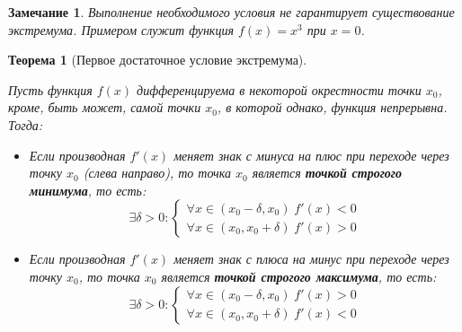 \documentclass[a4paper,12pt,oneside]{extbook}
\newcommand{\newpar}{$ $\par\nobreak\ignorespaces}
\theoremstyle{numbered}
\theoremstyle{unnumbered}
\theoremstyle{named}
\newtheorem{theorem}{Теорема}[section]
\theoremstyle{unnumbered}
\theoremstyle{named}
\theoremstyle{named}
\theoremstyle{named}
\newtheorem*{note}{Замечание}
\begin{document}
\begin{note}
    Выполнение необходимого условия не гарантирует существование экстремума. Примером служит функция \(f(x) = x^3\) при \(x = 0\).
\end{note}

\begin{theorem}[Первое достаточное условие экстремума]
    \label{theorem:Первое достаточное условие экстремума}
    \newpar
    Пусть функция \(f(x)\) дифференцируема в некоторой окрестности точки \(x_0\), кроме, быть может, самой точки \(x_0\), в которой однако, функция непрерывна. Тогда:
    \begin{itemize}
        \item {
              Если производная \(f'(x)\) меняет знак с минуса на плюс при переходе через точку \(x_0\) (слева направо), то точка \(x_0\) является \textbf{точкой строгого минимума}, то есть:
              \[
                  \exists \delta > 0:
                  \begin{cases}
                      \forall x \in (x_0 - \delta, x_0) \; f'(x) < 0 \\
                      \forall x \in (x_0, x_0 + \delta) \; f'(x) > 0
                  \end{cases}
              \]
              }
              \item{
                          Если производная \(f'(x)\) меняет знак с плюса на минус при переходе через точку \(x_0\), то точка \(x_0\) является \textbf{точкой строгого максимума}, то есть:
                          \[
                              \exists \delta > 0:
                              \begin{cases}
                                  \forall x \in (x_0 - \delta, x_0) \; f'(x) > 0 \\
                                  \forall x \in (x_0, x_0 + \delta) \; f'(x) < 0
                              \end{cases}
                          \]
                    }
    \end{itemize}
\end{theorem}
\end{document}
